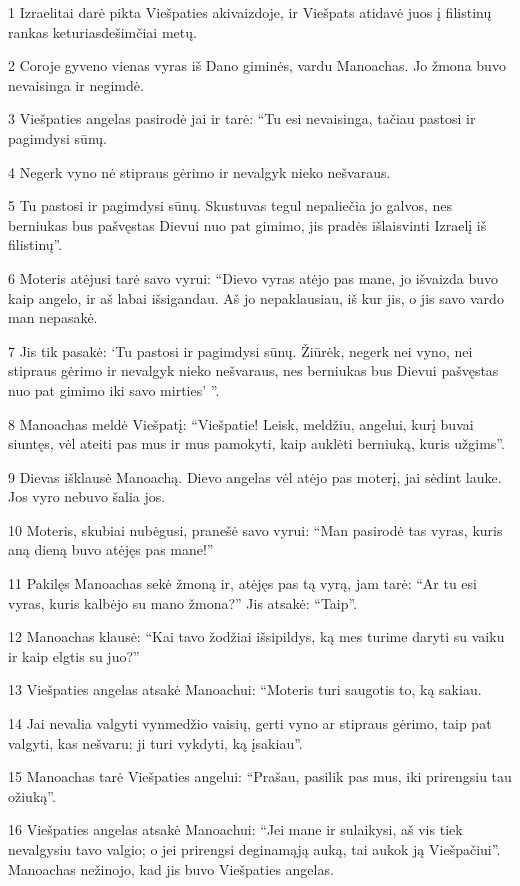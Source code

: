 \par 1 Izraelitai darė pikta Viešpaties akivaizdoje, ir Viešpats atidavė juos į filistinų rankas keturiasdešimčiai metų. 
\par 2 Coroje gyveno vienas vyras iš Dano giminės, vardu Manoachas. Jo žmona buvo nevaisinga ir negimdė. 
\par 3 Viešpaties angelas pasirodė jai ir tarė: “Tu esi nevaisinga, tačiau pastosi ir pagimdysi sūnų. 
\par 4 Negerk vyno nė stipraus gėrimo ir nevalgyk nieko nešvaraus. 
\par 5 Tu pastosi ir pagimdysi sūnų. Skustuvas tegul nepaliečia jo galvos, nes berniukas bus pašvęstas Dievui nuo pat gimimo, jis pradės išlaisvinti Izraelį iš filistinų”. 
\par 6 Moteris atėjusi tarė savo vyrui: “Dievo vyras atėjo pas mane, jo išvaizda buvo kaip angelo, ir aš labai išsigandau. Aš jo nepaklausiau, iš kur jis, o jis savo vardo man nepasakė. 
\par 7 Jis tik pasakė: ‘Tu pastosi ir pagimdysi sūnų. Žiūrėk, negerk nei vyno, nei stipraus gėrimo ir nevalgyk nieko nešvaraus, nes berniukas bus Dievui pašvęstas nuo pat gimimo iki savo mirties’ ”. 
\par 8 Manoachas meldė Viešpatį: “Viešpatie! Leisk, meldžiu, angelui, kurį buvai siuntęs, vėl ateiti pas mus ir mus pamokyti, kaip auklėti berniuką, kuris užgims”. 
\par 9 Dievas išklausė Manoachą. Dievo angelas vėl atėjo pas moterį, jai sėdint lauke. Jos vyro nebuvo šalia jos. 
\par 10 Moteris, skubiai nubėgusi, pranešė savo vyrui: “Man pasirodė tas vyras, kuris aną dieną buvo atėjęs pas mane!” 
\par 11 Pakilęs Manoachas sekė žmoną ir, atėjęs pas tą vyrą, jam tarė: “Ar tu esi vyras, kuris kalbėjo su mano žmona?” Jis atsakė: “Taip”. 
\par 12 Manoachas klausė: “Kai tavo žodžiai išsipildys, ką mes turime daryti su vaiku ir kaip elgtis su juo?” 
\par 13 Viešpaties angelas atsakė Manoachui: “Moteris turi saugotis to, ką sakiau. 
\par 14 Jai nevalia valgyti vynmedžio vaisių, gerti vyno ar stipraus gėrimo, taip pat valgyti, kas nešvaru; ji turi vykdyti, ką įsakiau”. 
\par 15 Manoachas tarė Viešpaties angelui: “Prašau, pasilik pas mus, iki prirengsiu tau ožiuką”. 
\par 16 Viešpaties angelas atsakė Manoachui: “Jei mane ir sulaikysi, aš vis tiek nevalgysiu tavo valgio; o jei prirengsi deginamąją auką, tai aukok ją Viešpačiui”. Manoachas nežinojo, kad jis buvo Viešpaties angelas. 

